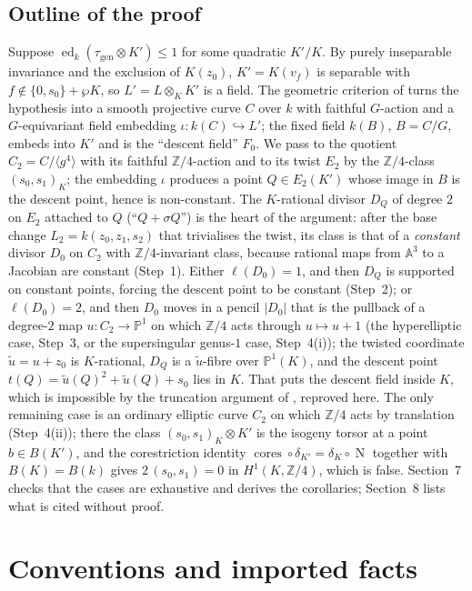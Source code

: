 \documentclass[11pt]{amsart}
\theoremstyle{definition}
\theoremstyle{remark}
\newcommand{\ed}{\operatorname{ed}}
\newcommand{\gen}{\mathrm{gen}}
\newcommand{\Z}{\mathbb Z}
\newcommand{\A}{\mathbb A}
\newcommand{\PP}{\mathbb P}
\newcommand{\cores}{\operatorname{cores}}
\newcommand{\Nm}{\operatorname{N}}
\newcommand{\ut}{\tilde u}
\begin{document}
\subsection*{Outline of the proof}
Suppose $\ed_k(\tau_{\gen}\otimes K')\le1$ for some quadratic $K'/K$. By purely
inseparable invariance and the exclusion of $K(z_0)$, $K'=K(v_f)$ is separable with
$f\notin\{0,s_0\}+\wp K$, so $L'=L\otimes_KK'$ is a field. The geometric criterion of
\cite[Theorem 4.2, Corollary 4.4]{P} turns the hypothesis into a smooth projective curve
$C$ over $k$ with faithful $G$-action and a $G$-equivariant field embedding
$\iota\colon k(C)\hookrightarrow L'$; the fixed field $k(B)$, $B=C/G$, embeds into $K'$
and is the ``descent field'' $F_0$. We pass to the quotient $C_2=C/\langle g^4\rangle$
with its faithful $\Z/4$-action and to its twist $E_2$ by the $\Z/4$-class $(s_0,s_1)_K$;
the embedding $\iota$ produces a point $Q\in E_2(K')$ whose image in $B$ is the descent
point, hence is non-constant. The $K$-rational divisor $D_Q$ of degree $2$ on $E_2$
attached to $Q$ (``$Q+\sigma Q$'') is the heart of the argument: after the base change
$L_2=k(z_0,z_1,s_2)$ that trivialises the twist, its class is that of a
\emph{constant} divisor $D_0$ on $C_2$ with $\Z/4$-invariant class, because rational
maps from $\A^3$ to a Jacobian are constant (Step~1). Either $\ell(D_0)=1$, and then
$D_Q$ is supported on constant points, forcing the descent point to be constant
(Step~2); or $\ell(D_0)=2$, and then $D_0$ moves in a pencil $|D_0|$ that is the pullback
of a degree-$2$ map $u\colon C_2\to\PP^1$ on which $\Z/4$ acts through $u\mapsto u+1$
(the hyperelliptic case, Step~3, or the supersingular genus-$1$ case, Step~4(i)); the
twisted coordinate $\ut=u+z_0$ is $K$-rational, $D_Q$ is a $\ut$-fibre over $\PP^1(K)$,
and the descent point $t(Q)=\ut(Q)^2+\ut(Q)+s_0$ lies in $K$. That puts the descent
field inside $K$, which is impossible by the truncation argument of
\cite[Theorem 11.6(b)]{A}, reproved here. The only remaining case is an ordinary elliptic
curve $C_2$ on which $\Z/4$ acts by translation (Step~4(ii)); there the class
$(s_0,s_1)_K\otimes K'$ is the isogeny torsor at a point $b\in B(K')$, and the
corestriction identity $\cores\circ\delta_{K'}=\delta_K\circ\Nm$ together with
$B(K)=B(k)$ gives $2\,(s_0,s_1)=0$ in $H^1(K,\Z/4)$, which is false. Section~7 checks
that the cases are exhaustive and derives the corollaries; Section~8 lists what is cited
without proof.

\section{Conventions and imported facts}\label{sec:facts}
\end{document}
